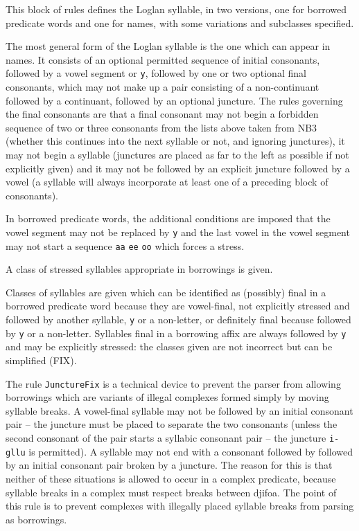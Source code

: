 \documentclass[12pt]{article}
\begin{document}
This block of rules defines the Loglan syllable, in two versions, one for borrowed predicate words and one for names,
with some variations and subclasses specified.

The most general form of the Loglan syllable is the one which can appear in names.  It consists of
an optional permitted sequence of initial consonants, followed by a vowel segment or {\tt y}, followed by one or two optional final consonants,
which may not make up a pair consisting of a non-continuant followed by a continuant, followed by an optional juncture.
The rules governing the final consonants are that a final consonant may not begin a forbidden sequence of two or three consonants
from the lists above taken from NB3 (whether this continues into the next syllable or not, and ignoring junctures), it may not begin a syllable (junctures are placed as far to the left as possible if not explicitly given) and it may not be followed by an explicit juncture followed by a vowel (a syllable will always incorporate at least one of a preceding block of consonants).

In borrowed predicate words, the additional conditions are imposed that the vowel segment may not be replaced
by {\tt y} and the last vowel in the vowel segment may not start a sequence {\tt aa} {\tt ee} {\tt oo} which forces a stress.

A class of stressed syllables appropriate in borrowings is given.

Classes of syllables are given which can be identified as (possibly) final in a borrowed predicate word
because they are vowel-final,  not explicitly stressed and followed by another syllable, {\tt y} or a non-letter,
or definitely final because followed by {\tt y} or a non-letter.  Syllables final in a borrowing affix are always
followed by {\tt y} and may be explicitly stressed:  the classes given are not incorrect but can be simplified (FIX).

The rule {\tt JunctureFix} is a technical device to prevent the parser from allowing borrowings which are variants of illegal complexes formed simply by moving syllable breaks.  A vowel-final syllable may not be followed by an initial consonant
pair -- the juncture must be placed to separate the two consonants (unless the second consonant of the pair starts
a syllabic consonant pair -- the juncture {\tt i-gllu} is permitted).  A syllable may not end with a consonant followed by
followed by an initial consonant pair broken by a juncture.  The reason for this is that neither of these situations
is allowed to occur in a complex predicate, because syllable breaks in a complex must respect breaks between djifoa.  The point of this rule
is to prevent complexes with illegally placed syllable breaks from parsing as borrowings.
\end{document}
